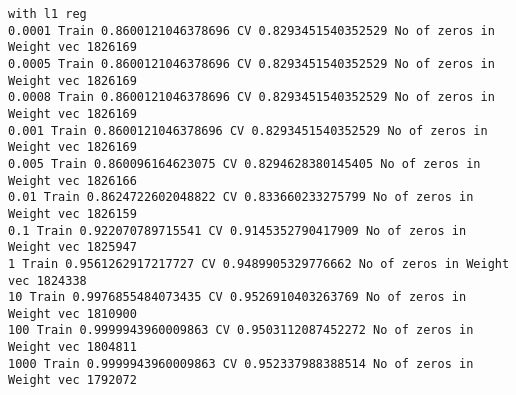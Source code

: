 \documentclass[11pt]{article}
\begin{document}
    \begin{Verbatim}[commandchars=\\\{\}]
with l1 reg
0.0001 Train 0.8600121046378696 CV 0.8293451540352529 No of zeros in Weight vec 1826169
0.0005 Train 0.8600121046378696 CV 0.8293451540352529 No of zeros in Weight vec 1826169
0.0008 Train 0.8600121046378696 CV 0.8293451540352529 No of zeros in Weight vec 1826169
0.001 Train 0.8600121046378696 CV 0.8293451540352529 No of zeros in Weight vec 1826169
0.005 Train 0.860096164623075 CV 0.8294628380145405 No of zeros in Weight vec 1826166
0.01 Train 0.8624722602048822 CV 0.833660233275799 No of zeros in Weight vec 1826159
0.1 Train 0.922070789715541 CV 0.9145352790417909 No of zeros in Weight vec 1825947
1 Train 0.9561262917217727 CV 0.9489905329776662 No of zeros in Weight vec 1824338
10 Train 0.9976855484073435 CV 0.9526910403263769 No of zeros in Weight vec 1810900
100 Train 0.9999943960009863 CV 0.9503112087452272 No of zeros in Weight vec 1804811
1000 Train 0.9999943960009863 CV 0.952337988388514 No of zeros in Weight vec 1792072

    \end{Verbatim}
\end{document}
